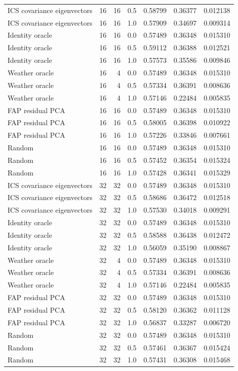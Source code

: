 \begin{tabular}{lrrrrrr}
ICS covariance eigenvectors & 16 & 16 & 0.5 & 0.58799 & 0.36377 & 0.012138 \\
ICS covariance eigenvectors & 16 & 16 & 1.0 & 0.57909 & 0.34697 & 0.009314 \\
Identity oracle & 16 & 16 & 0.0 & 0.57489 & 0.36348 & 0.015310 \\
Identity oracle & 16 & 16 & 0.5 & 0.59112 & 0.36388 & 0.012521 \\
Identity oracle & 16 & 16 & 1.0 & 0.57573 & 0.35586 & 0.009846 \\
Weather oracle & 16 & 4 & 0.0 & 0.57489 & 0.36348 & 0.015310 \\
Weather oracle & 16 & 4 & 0.5 & 0.57334 & 0.36391 & 0.008636 \\
Weather oracle & 16 & 4 & 1.0 & 0.57146 & 0.22484 & 0.005835 \\
FAP residual PCA & 16 & 16 & 0.0 & 0.57489 & 0.36348 & 0.015310 \\
FAP residual PCA & 16 & 16 & 0.5 & 0.58005 & 0.36398 & 0.010922 \\
FAP residual PCA & 16 & 16 & 1.0 & 0.57226 & 0.33846 & 0.007661 \\
Random & 16 & 16 & 0.0 & 0.57489 & 0.36348 & 0.015310 \\
Random & 16 & 16 & 0.5 & 0.57452 & 0.36354 & 0.015324 \\
Random & 16 & 16 & 1.0 & 0.57428 & 0.36341 & 0.015329 \\
ICS covariance eigenvectors & 32 & 32 & 0.0 & 0.57489 & 0.36348 & 0.015310 \\
ICS covariance eigenvectors & 32 & 32 & 0.5 & 0.58686 & 0.36472 & 0.012518 \\
ICS covariance eigenvectors & 32 & 32 & 1.0 & 0.57530 & 0.34018 & 0.009291 \\
Identity oracle & 32 & 32 & 0.0 & 0.57489 & 0.36348 & 0.015310 \\
Identity oracle & 32 & 32 & 0.5 & 0.58588 & 0.36438 & 0.012472 \\
Identity oracle & 32 & 32 & 1.0 & 0.56059 & 0.35190 & 0.008867 \\
Weather oracle & 32 & 4 & 0.0 & 0.57489 & 0.36348 & 0.015310 \\
Weather oracle & 32 & 4 & 0.5 & 0.57334 & 0.36391 & 0.008636 \\
Weather oracle & 32 & 4 & 1.0 & 0.57146 & 0.22484 & 0.005835 \\
FAP residual PCA & 32 & 32 & 0.0 & 0.57489 & 0.36348 & 0.015310 \\
FAP residual PCA & 32 & 32 & 0.5 & 0.58120 & 0.36362 & 0.011128 \\
FAP residual PCA & 32 & 32 & 1.0 & 0.56837 & 0.33287 & 0.006720 \\
Random & 32 & 32 & 0.0 & 0.57489 & 0.36348 & 0.015310 \\
Random & 32 & 32 & 0.5 & 0.57461 & 0.36367 & 0.015424 \\
Random & 32 & 32 & 1.0 & 0.57431 & 0.36308 & 0.015468 \\
\bottomrule
\end{tabular}
